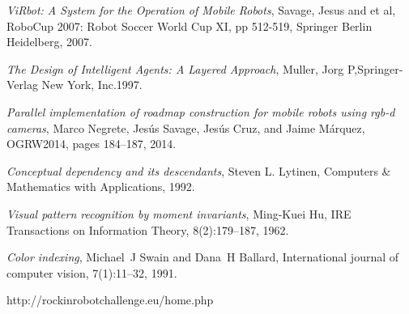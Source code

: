\documentclass{llncs}
\begin{document}
%
%



\begin{thebibliography}{1}


{\em ViRbot: A System for the Operation of Mobile Robots}, Savage, Jesus and et al, RoboCup 2007: Robot Soccer World Cup XI,
pp 512-519, Springer Berlin Heidelberg, 2007.

{\em The Design of Intelligent Agents: A Layered Approach}, Muller, Jorg P,Springer-Verlag New York, Inc.1997.


{\em Parallel implementation of roadmap construction for mobile robots using rgb-d cameras},
Marco Negrete, Jes{\'u}s Savage, Jes{\'u}s Cruz, and Jaime M{\'a}rquez, OGRW2014, pages 184--187, 2014.

{\em Conceptual dependency and its descendants}, Steven L. Lytinen, Computers \& Mathematics with Applications, 1992.

{\em Visual pattern recognition by moment invariants}, Ming-Kuei Hu, IRE Transactions on Information Theory, 8(2):179--187, 1962.

{\em Color indexing},  Michael~J Swain and Dana~H Ballard, International journal of computer vision, 7(1):11--32, 1991.


http://rockinrobotchallenge.eu/home.php


\end{thebibliography}
\end{document}
